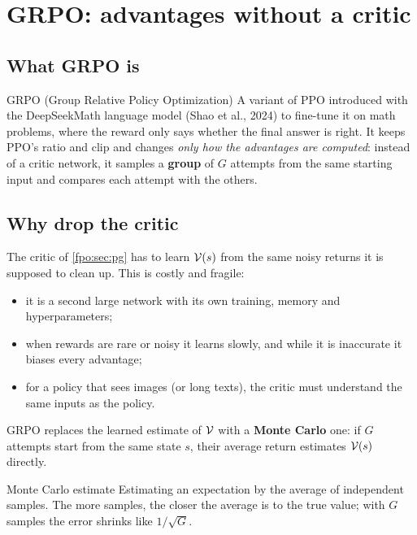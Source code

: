 \section{GRPO: advantages without a critic}\label{fpo:sec:grpo}

\subsection{What GRPO is}
\begin{newc}{GRPO (Group Relative Policy Optimization)}
A variant of PPO introduced with the DeepSeekMath language model (Shao et al., 2024) to fine-tune it on math problems, where the reward only says whether the final answer is right. It keeps PPO's ratio and clip and changes \emph{only how the advantages are computed}: instead of a critic network, it samples a \textbf{group} of $G$ attempts from the same starting input and compares each attempt with the others.
\end{newc}

\subsection{Why drop the critic}
The critic of \cref{fpo:sec:pg} has to learn $\mathcal{V}(s)$ from the same noisy returns it is supposed to clean up. This is costly and fragile:
\begin{itemize}
\item it is a second large network with its own training, memory and hyperparameters;
\item when rewards are rare or noisy it learns slowly, and while it is inaccurate it biases every advantage;
\item for a policy that sees images (or long texts), the critic must understand the same inputs as the policy.
\end{itemize}
GRPO replaces the learned estimate of $\mathcal{V}$ with a \textbf{Monte Carlo} one: if $G$ attempts start from the same state $s$, their average return estimates $\mathcal{V}(s)$ directly.

\begin{newc}{Monte Carlo estimate}
Estimating an expectation by the average of independent samples. The more samples, the closer the average is to the true value; with $G$ samples the error shrinks like $1/\sqrt G$.
\end{newc}

